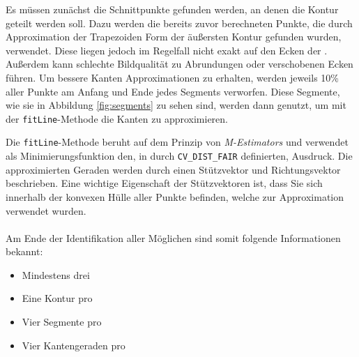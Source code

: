 Es müssen zunächst die Schnittpunkte gefunden werden, an denen die Kontur geteilt werden soll. Dazu werden die bereits zuvor berechneten Punkte, die durch Approximation der Trapezoiden Form der äußersten Kontur gefunden wurden, verwendet. Diese liegen jedoch im Regelfall nicht exakt auf den Ecken der \fps. Außerdem kann schlechte Bildqualität zu Abrundungen oder verschobenen Ecken führen. Um bessere Kanten Approximationen zu erhalten, werden jeweils 10\% aller Punkte am Anfang und Ende jedes Segments verworfen. Diese Segmente, wie sie in Abbildung \ref{fig:segments} zu sehen sind, werden dann genutzt, um mit der \texttt{fitLine}-Methode die Kanten zu approximieren.

Die \texttt{fitLine}-Methode beruht auf dem Prinzip von \emph{M-Estimators} und verwendet als Minimierungsfunktion den, in \OpenCV durch \texttt{CV\_DIST\_FAIR} definierten, Ausdruck. Die approximierten Geraden werden durch einen Stützvektor und Richtungsvektor beschrieben. Eine wichtige Eigenschaft der Stützvektoren ist, dass Sie sich innerhalb der konvexen Hülle aller Punkte befinden, welche zur Approximation verwendet wurden.
\\\\
Am Ende der Identifikation aller Möglichen \fps sind somit folgende Informationen bekannt:
\begin{itemize}
	\item Mindestens drei \fps
	\item Eine Kontur pro \fp
	\item Vier Segmente pro \fp
	\item Vier Kantengeraden pro \fp
\end{itemize}